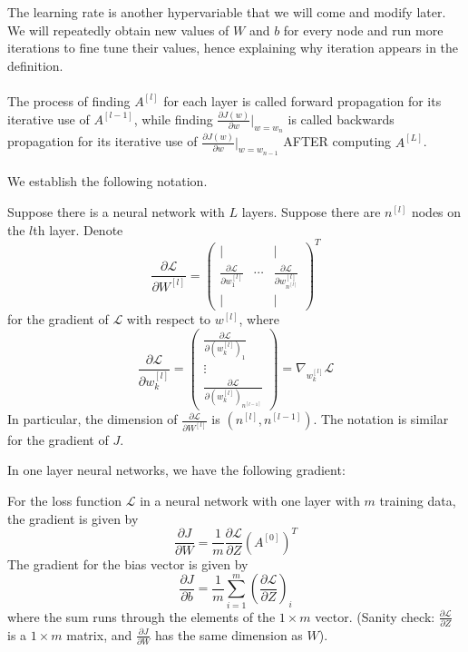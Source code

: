 \documentclass[a4paper]{article}
\begin{document}
The learning rate is another hypervariable that we will come and modify later. We will repeatedly obtain new values of $W$ and $b$ for every node and run more iterations to fine tune their values, hence explaining why iteration appears in the definition. \\~\\
The process of finding $A^{[l]}$ for each layer is called forward propagation for its iterative use of $A^{[l-1]}$, while finding $\frac{\partial J(w)}{\partial w}|_{w=w_n}$ is called backwards propagation for its iterative use of $\frac{\partial J(w)}{\partial w}|_{w=w_{n-1}}$ AFTER computing $A^{[L]}$. \\~\\ We establish the following notation. 

\begin{defn}{}{} Suppose there is a neural network with $L$ layers. Suppose there are $n^{[l]}$ nodes on the $l$th layer. Denote $$\frac{\partial\mathcal{L}}{\partial W^{[l]}}=\begin{pmatrix}
| & & |\\
\frac{\partial\mathcal{L}}{\partial w_1^{[l]}} & \cdots & \frac{\partial\mathcal{L}}{\partial w_{n^{[l]}}^{[l]}}\\
| & & |
\end{pmatrix}^T$$ for the gradient of $\mathcal{L}$ with respect to $w^{[l]}$, where $$\frac{\partial\mathcal{L}}{\partial w_k^{[l]}}=\begin{pmatrix}
\frac{\partial\mathcal{L}}{\partial (w_k^{[l]})_1}\\
\vdots\\
\frac{\partial\mathcal{L}}{\partial (w_k^{[l]})_{n^{[l-1]}}}
\end{pmatrix}=\nabla_{w_k^{[l]}}\mathcal{L}$$
In particular, the dimension of $\frac{\partial\mathcal{L}}{\partial W^{[l]}}$ is $(n^{[l]},n^{[l-1]})$. The notation is similar for the gradient of $J$. 
\end{defn}

In one layer neural networks, we have the following gradient: 

\begin{prp}{}{} For the loss function $\mathcal{L}$ in a neural network with one layer with $m$ training data, the gradient is given by $$\frac{\partial J}{\partial W}=\frac{1}{m}\frac{\partial\mathcal{L}}{\partial Z}(A^{[0]})^T$$  The gradient for the bias vector is given by $$\frac{\partial J}{\partial b}=\frac{1}{m}\sum_{i=1}^m\left(\frac{\partial\mathcal{L}}{\partial Z}\right)_i$$ where the sum runs through the elements of the $1\times m$ vector. (Sanity check: $\frac{\partial\mathcal{L}}{\partial Z}$ is a $1\times m$ matrix, and $\frac{\partial J}{\partial W}$ has the same dimension as $W$).
\end{prp}
\end{document}
